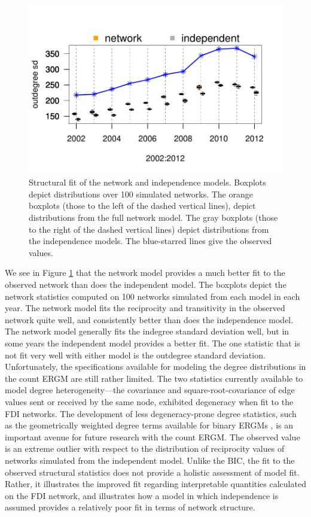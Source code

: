 \documentclass[reqno,onecolumn,letterpaper,12pt]{article}
\begin{document}
\begin{figure}[]
\includegraphics[scale=.75, trim = 0cm 1.5cm .1cm 2.4cm, clip=true]{figures/odsd_fit.pdf} \vspace{-.2cm}
\caption{\label{fig:structureFit} Structural fit of the network and independence models. Boxplots depict distributions over 100 simulated networks. The orange boxplots (those to the left of the dashed vertical lines), depict distributions from the full network model. The gray boxplots (those to the right of the dashed vertical lines) depict distributions from the independence models. The blue-starred lines give the observed values. }
\end{figure}
We see in Figure \ref{fig:structureFit} that the network model provides a much better fit to the observed network than does the independent model. The boxplots depict the network statistics computed on 100 networks simulated from each model in each year. The network model fits the reciprocity and transitivity in the observed network quite well, and consistently better than does the independence model. The network model generally fits the indegree standard deviation well, but in some years the independent model provides a better fit. The one statistic that is not fit very well with either model is the outdegree standard deviation. Unfortunately, the specifications available for modeling the degree distributions in the count ERGM are still rather limited. The two statistics currently available to model degree heterogeneity---the covariance and square-root-covariance of edge values sent or received by the same node, exhibited degeneracy when fit to the FDI networks. The development of less degeneracy-prone degree statistics, such as the geometrically weighted degree terms available for binary ERGMs \citep{snijders2006new}, is an important avenue for future research with the count ERGM. The observed value is an extreme outlier with respect to the distribution of reciprocity values of networks simulated from the independent model. Unlike the BIC, the fit to the observed structural statistics does not provide a holistic assessment of model fit. Rather, it illustrates the improved fit regarding interpretable quantities calculated on the FDI network, and illustrates how a model in which independence is assumed provides a relatively poor fit in terms of network structure.
\end{document}
